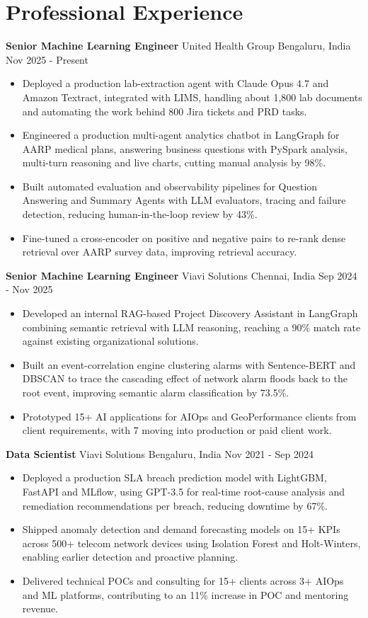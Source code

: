 \documentclass[10pt,a4paper]{article}
\newcommand{\role}[4]{\textbf{#1} \textbar{} #2 \hfill #3 \textbar{} #4\par}
\begin{document}
\section{Professional Experience}
\role{Senior Machine Learning Engineer}{United Health Group}{Bengaluru, India}{Nov 2025 - Present}
\begin{itemize}
  \item Deployed a production lab-extraction agent with Claude Opus 4.7 and Amazon Textract, integrated with LIMS, handling about 1,800 lab documents and automating the work behind 800 Jira tickets and PRD tasks.
  \item Engineered a production multi-agent analytics chatbot in LangGraph for AARP medical plans, answering business questions with PySpark analysis, multi-turn reasoning and live charts, cutting manual analysis by 98\%.
  \item Built automated evaluation and observability pipelines for Question Answering and Summary Agents with LLM evaluators, tracing and failure detection, reducing human-in-the-loop review by 43\%.
  \item Fine-tuned a cross-encoder on positive and negative pairs to re-rank dense retrieval over AARP survey data, improving retrieval accuracy.
\end{itemize}
\vspace{3pt}
\role{Senior Machine Learning Engineer}{Viavi Solutions}{Chennai, India}{Sep 2024 - Nov 2025}
\begin{itemize}
  \item Developed an internal RAG-based Project Discovery Assistant in LangGraph combining semantic retrieval with LLM reasoning, reaching a 90\% match rate against existing organizational solutions.
  \item Built an event-correlation engine clustering alarms with Sentence-BERT and DBSCAN to trace the cascading effect of network alarm floods back to the root event, improving semantic alarm classification by 73.5\%.
  \item Prototyped 15+ AI applications for AIOps and GeoPerformance clients from client requirements, with 7 moving into production or paid client work.
\end{itemize}
\vspace{3pt}
\role{Data Scientist}{Viavi Solutions}{Bengaluru, India}{Nov 2021 - Sep 2024}
\begin{itemize}
  \item Deployed a production SLA breach prediction model with LightGBM, FastAPI and MLflow, using GPT-3.5 for real-time root-cause analysis and remediation recommendations per breach, reducing downtime by 67\%.
  \item Shipped anomaly detection and demand forecasting models on 15+ KPIs across 500+ telecom network devices using Isolation Forest and Holt-Winters, enabling earlier detection and proactive planning.
  \item Delivered technical POCs and consulting for 15+ clients across 3+ AIOps and ML platforms, contributing to an 11\% increase in POC and mentoring revenue.
\end{itemize}
\end{document}
